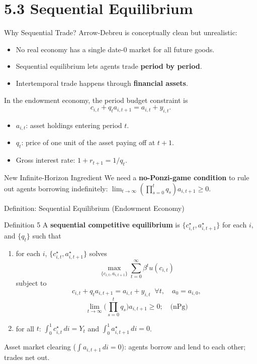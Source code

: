\documentclass[aspectratio=169,10pt]{beamer}
\begin{document}
\section{5.3 Sequential Equilibrium}

\begin{frame}{Why Sequential Trade?}
Arrow-Debreu is conceptually clean but unrealistic:
\begin{itemize}
  \item No real economy has a single date-0 market for all future goods.
  \item Sequential equilibrium lets agents trade \textbf{period by period}.
  \item Intertemporal trade happens through \textbf{financial assets}.
\end{itemize}

\medskip
In the endowment economy, the period budget constraint is
\[
c_{i,t}+q_t a_{i,t+1}=a_{i,t}+y_{i,t}.
\]

\begin{itemize}
  \item $a_{i,t}$: asset holdings entering period $t$.
  \item $q_t$: price of one unit of the asset paying off at $t+1$.
  \item Gross interest rate: $1+r_{t+1}=1/q_t$.
\end{itemize}

\begin{block}{New Infinite-Horizon Ingredient}
We need a \textbf{no-Ponzi-game condition} to rule out agents borrowing indefinitely: $\displaystyle\lim_{t\to\infty}\left(\prod_{s=0}^{t} q_s\right)a_{i,t+1}\ge 0.$
\end{block}
\end{frame}

\begin{frame}{Definition: Sequential Equilibrium (Endowment Economy)}
\begin{block}{Definition 5}
A \textbf{sequential competitive equilibrium} is $\{c_{i,t}^\star, a_{i,t+1}^\star\}$ for each $i$, and $\{q_t\}$ such that
\begin{enumerate}
  \item for each $i$, $\{c_{i,t}^\star, a_{i,t+1}^\star\}$ solves
  \[
  \max_{\{c_{i,t},a_{i,t+1}\}} \sum_{t=0}^{\infty}\beta^t u(c_{i,t})
  \]
  subject to
  \[
  c_{i,t}+q_t a_{i,t+1}=a_{i,t}+y_{i,t} \;\;\forall t, \quad a_0=a_{i,0},
  \]
  \[
  \lim_{t\to\infty}\Big(\prod_{s=0}^{t} q_s\Big)a_{i,t+1}\ge 0; \quad\text{(nPg)}
  \]
  \item for all $t$: $\displaystyle\int_0^1 c_{i,t}^\star\,di=Y_t$ and $\displaystyle\int_0^1 a_{i,t+1}^\star\,di=0$.
\end{enumerate}
\end{block}

Asset market clearing ($\int a_{i,t+1}\,di=0$): agents borrow and lend to each other; trades net out.
\end{frame}
\end{document}
